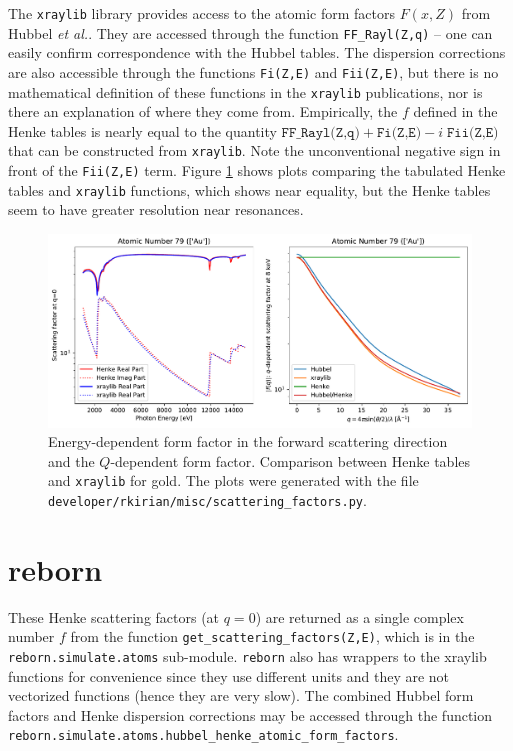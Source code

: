 \documentclass[11pt]{article}
\begin{document}
The \texttt{xraylib} library\cite{schoonjansXraylibLibraryXray2011,brunettiLibraryXrayMatter2004} provides access to the
atomic form factors  $F(x,Z)$  from Hubbel {\itshape et al.}\cite{hubbellAtomicFormFactors1975}.  They are accessed
through the function \texttt{FF\_Rayl(Z,q)} -- one can easily confirm correspondence with the Hubbel tables.  The
dispersion corrections are also accessible through the functions \texttt{Fi(Z,E)} and \texttt{Fii(Z,E)}, but there is
no mathematical definition of these functions in the \texttt{xraylib} publications, nor is there an explanation of where
they come from.   Empirically, the $f$ defined in the Henke tables is nearly equal to the quantity
$\texttt{FF\_Rayl(Z,q)} + \texttt{Fi(Z,E)} - i\; \texttt{Fii(Z,E)}$ that can be constructed from \texttt{xraylib}.  Note
the unconventional negative sign in front of the \texttt{Fii(Z,E)} term.  Figure \ref{fig:forms} shows plots comparing
the tabulated Henke tables and \texttt{xraylib} functions, which shows near equality, but the Henke tables seem to have
greater resolution near resonances.
\begin{figure}[htbp]
   \centering
   \includegraphics[width=\textwidth]{figures/formfactor_79.pdf} 
   \caption{Energy-dependent form factor in the forward scattering direction and the $Q$-dependent form factor.
   Comparison between Henke tables and \texttt{xraylib} for gold.  The plots were generated with the file
   \texttt{developer/rkirian/misc/scattering\_factors.py}.}
   \label{fig:forms}
\end{figure} 


\section{reborn}

These Henke scattering factors (at $q=0$) are returned as a single complex number $f$ from the function
\texttt{get\_scattering\_factors(Z,E)}, which is in the \texttt{reborn.simulate.atoms} sub-module.
\texttt{reborn} also has wrappers to the xraylib functions for convenience since they use different
units and they are not vectorized functions (hence they are very slow).  The combined Hubbel form
factors and Henke dispersion corrections may be accessed through the function
\texttt{reborn.simulate.atoms.hubbel\_henke\_atomic\_form\_factors}.
\end{document}
